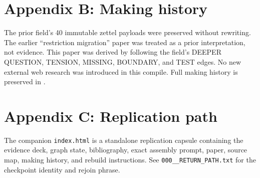 \documentclass[11pt]{article}
\begin{document}
\section*{Appendix B: Making history}
The prior field's 40 immutable zettel payloads were preserved without rewriting. The earlier ``restriction migration'' paper was treated as a prior interpretation, not evidence. This paper was derived by following the field's DEEPER QUESTION, TENSION, MISSING, BOUNDARY, and TEST edges. No new external web research was introduced in this compile. Full making history is preserved in \texttt{}.

\section*{Appendix C: Replication path}
The companion \texttt{index.html} is a standalone replication capsule containing the evidence deck, graph state, bibliography, exact assembly prompt, paper, source map, making history, and rebuild instructions. See \texttt{000\_\_RETURN\_PATH.txt} for the checkpoint identity and rejoin phrase.
\end{document}
